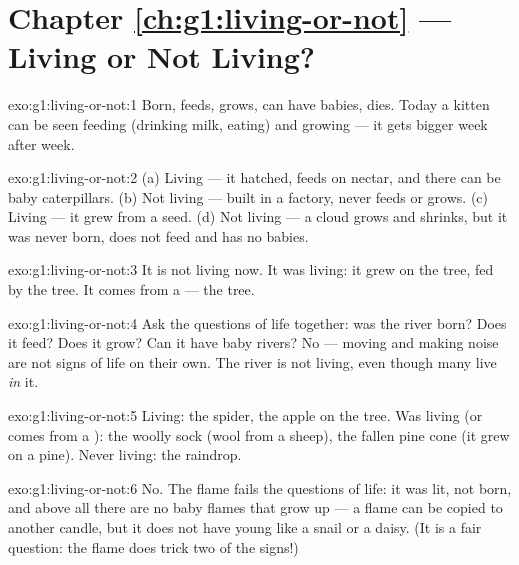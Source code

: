 \section*{Chapter \ref{ch:g1:living-or-not} --- Living or Not Living?}

\begin{solution}{exo:g1:living-or-not:1}
Born, feeds, grows, can have babies, dies. Today a kitten can be
seen feeding (drinking milk, eating) and growing --- it gets bigger
week after week.
\end{solution}

\begin{solution}{exo:g1:living-or-not:2}
(a) Living --- it hatched, feeds on nectar, and there can be baby
caterpillars. (b) Not living --- built in a factory, never feeds or
grows. (c) Living --- it grew from a seed. (d) Not living --- a
cloud grows and shrinks, but it was never born, does not feed and
has no babies.
\end{solution}

\begin{solution}{exo:g1:living-or-not:3}
It is not living now. It was living: it grew on the tree, fed by the
tree. It comes from a  --- the tree.
\end{solution}

\begin{solution}{exo:g1:living-or-not:4}
Ask the questions of life together: was the river born? Does it
feed? Does it grow? Can it have baby rivers? No --- moving and
making noise are not signs of life on their own. The river is not
living, even though many  live \emph{in} it.
\end{solution}

\begin{solution}{exo:g1:living-or-not:5}
Living: the spider, the apple on the tree. Was living (or comes
from a ): the woolly sock (wool from a sheep), the
fallen pine cone (it grew on a pine). Never living: the raindrop.
\end{solution}

\begin{solution}{exo:g1:living-or-not:6}
No. The flame fails the questions of life: it was lit, not born,
and above all there are no baby flames that grow up --- a flame can
be copied to another candle, but it does not have young like a
snail or a daisy. (It is a fair question: the flame does trick two
of the signs!)
\end{solution}

